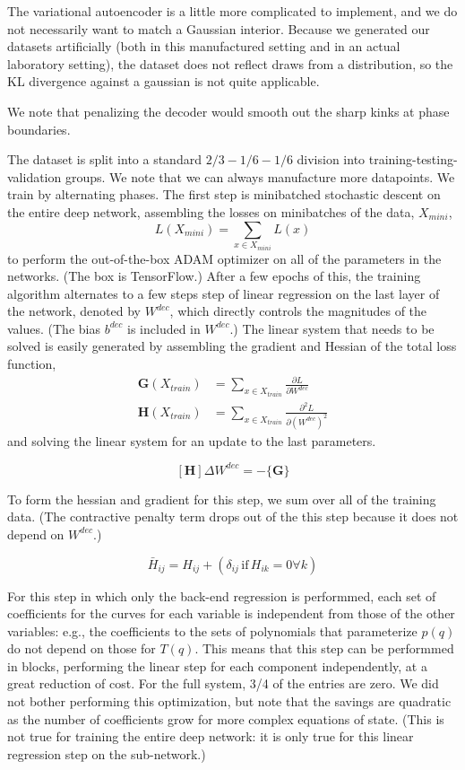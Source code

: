 \documentclass[]{article}
\begin{document}
The variational autoencoder is a little more complicated to implement,
and we do not necessarily want to match a Gaussian interior. Because we
generated our datasets artificially (both in this manufactured setting
and in an actual laboratory setting), the dataset does not reflect draws
from a distribution, so the KL divergence against a gaussian is not
quite applicable.

We note that penalizing the decoder would smooth out the sharp kinks at
phase boundaries.

The dataset is split into a standard $2/3-1/6-1/6$ division into
training-testing-validation groups. We note that we can always
manufacture more datapoints. We train by alternating phases. The first
step is minibatched stochastic descent on the entire deep network, assembling the losses on minibatches of the data, $X_{mini}$,
\begin{equation}
  L(X_{mini}) = \sum_{x\in X_{mini}} L(x)
  \end{equation}
to perform the out-of-the-box ADAM optimizer on all of the
parameters in the networks. (The box is
TensorFlow.) After a few epochs of this,
the training algorithm alternates to a few steps step of linear regression on the last layer of the network,
denoted by \(W^{dec}\), which directly controls the magnitudes of the values.
(The bias $b^{dec}$ is included in $W^{dec}$.) The linear
system that needs to be solved is easily generated by assembling the
gradient and Hessian of the total loss function,
\begin{align}
 \mathbf{G}\left(X_{train}\right) &= \sum_{x\in X_{train}}\frac{\partial L}{\partial W^{dec}} \\
\mathbf{H}\left(X_{train}\right) &= \sum_{x\in X_{train}}\frac{\partial^2 L}{\partial (W^{dec})^2}
\end{align}
and solving the linear system for an update to the last parameters.

\[[\mathbf{H}] \Delta W^{dec} = -\{\mathbf{G}\}\]

To form the hessian and gradient for this step, we sum over all of the
training data. (The contractive penalty term drops out of the this step because it does
not depend on \(W^{dec}\).)

\begin{equation}
\bar{H}_{ij} = H_{ij} + \left(\delta_{ij}\,\text{if}\,H_{ik}=0\forall k\right)
  \end{equation}

For this step in which only the back-end regression is performmed, each set of coefficients for the curves for each variable is independent from those of the other variables: e.g., the coefficients to the sets of polynomials that parameterize $p(q)$ do not depend on those for $T(q)$. This means that this step can be performmed in blocks, performing the linear step for each component independently, at a great reduction of cost. For the full system, 3/4 of the entries are zero. We did not bother performing this optimization, but note that the savings are quadratic as the number of coefficients grow for more complex equations of state. (This is not true for training the entire deep network: it is only true for this linear regression step on the sub-network.)
\end{document}

